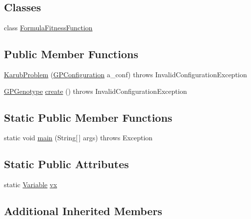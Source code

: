 \subsection*{Classes}
\begin{DoxyCompactItemize}
\item 
class \hyperlink{classexamples_1_1gp_1_1_karub_problem_1_1_formula_fitness_function}{Formula\-Fitness\-Function}
\end{DoxyCompactItemize}
\subsection*{Public Member Functions}
\begin{DoxyCompactItemize}
\item 
\hyperlink{classexamples_1_1gp_1_1_karub_problem_ae91bb18bcb51d688fa3a7a050f918cf9}{Karub\-Problem} (\hyperlink{classorg_1_1jgap_1_1gp_1_1impl_1_1_g_p_configuration}{G\-P\-Configuration} a\-\_\-conf)  throws Invalid\-Configuration\-Exception 
\item 
\hyperlink{classorg_1_1jgap_1_1gp_1_1impl_1_1_g_p_genotype}{G\-P\-Genotype} \hyperlink{classexamples_1_1gp_1_1_karub_problem_a6b963760636015b3a302ce58d8d5bd3c}{create} ()  throws Invalid\-Configuration\-Exception 
\end{DoxyCompactItemize}
\subsection*{Static Public Member Functions}
\begin{DoxyCompactItemize}
\item 
static void \hyperlink{classexamples_1_1gp_1_1_karub_problem_a837bc13ae2771aa320bfb7b06159e7d1}{main} (String\mbox{[}$\,$\mbox{]} args)  throws Exception 
\end{DoxyCompactItemize}
\subsection*{Static Public Attributes}
\begin{DoxyCompactItemize}
\item 
static \hyperlink{classorg_1_1jgap_1_1gp_1_1terminal_1_1_variable}{Variable} \hyperlink{classexamples_1_1gp_1_1_karub_problem_a76c8b191b7569a16251d82ec749a97f9}{vx}
\end{DoxyCompactItemize}
\subsection*{Additional Inherited Members}


